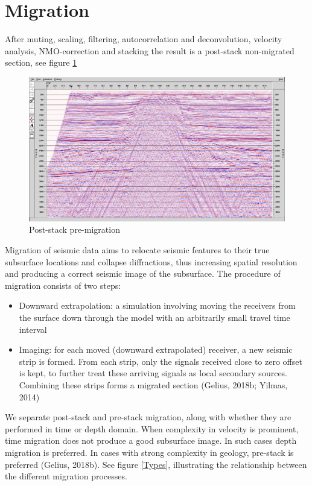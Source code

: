 \documentclass[10pt,a4paper]{article}
\begin{document}
\section{Migration}

After muting, scaling, filtering, autocorrelation and deconvolution, velocity analysis, NMO-correction and stacking the result is a post-stack non-migrated section, see figure \ref{fmig}

\begin{figure}[H]
\includegraphics[width=\textwidth]{fmig.jpg}
\caption{Post-stack pre-migration}
\label{fmig}
\end{figure}

\noindent Migration of seismic data aims to relocate seismic features to their true subsurface locations and collapse diffractions, thus increasing spatial resolution and producing a correct seismic image of the subsurface. The procedure of migration consists of two steps:

\begin{itemize}
    \item Downward extrapolation: a simulation involving moving the receivers from the surface down through the model with an arbitrarily small travel time interval
    \item Imaging: for each moved (downward extrapolated) receiver, a new seismic strip is formed. From each strip, only the signals received close to zero offset is kept, to further treat these arriving signals as local secondary sources. Combining these strips forms a migrated section (Gelius, 2018b; Yilmas, 2014)
\end{itemize}

\noindent We separate post-stack and pre-stack migration, along with whether they are performed in time or depth domain. When complexity in velocity is prominent, time migration does not produce a good subsurface image. In such cases depth migration is preferred. In cases with strong complexity in geology, pre-stack is preferred (Gelius, 2018b). See figure \ref{Types}, illustrating the relationship between the different migration processes.
\end{document}
